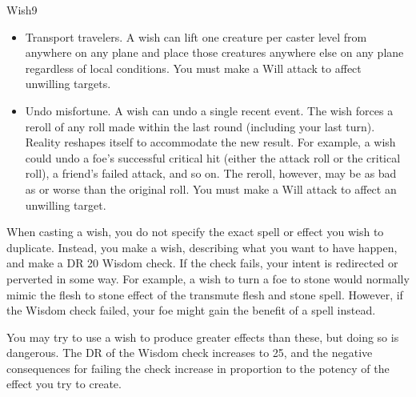 \begin{spellfooter}
\begin{spellsection}{Wish}{9}
\begin{spellcontent}
\begin{itemize}
            \item Transport travelers. A wish can lift one creature per caster level from anywhere on any plane and place those creatures anywhere else on any plane regardless of local conditions. You must make a Will attack to affect unwilling targets.
            \item Undo misfortune. A wish can undo a single recent event. The wish forces a reroll of any roll made within the last round (including your last turn). Reality reshapes itself to accommodate the new result. For example, a wish could undo a foe's successful critical hit (either the attack roll or the critical roll), a friend's failed attack, and so on. The reroll, however, may be as bad as or worse than the original roll. You must make a Will attack to affect an unwilling target.
        \end{itemize}
        \par When casting a wish, you do not specify the exact spell or effect you wish to duplicate. Instead, you make a wish, describing what you want to have happen, and make a DR 20 Wisdom check. If the check fails, your intent is redirected or perverted in some way. For example, a wish to turn a foe to stone would normally mimic the flesh to stone effect of the transmute flesh and stone spell. However, if the Wisdom check failed, your foe might gain the benefit of a  spell instead.
        \par You may try to use a wish to produce greater effects than these, but doing so is dangerous. The DR of the Wisdom check increases to 25, and the negative consequences for failing the check increase in proportion to the potency of the effect you try to create.
    \end{spellcontent}
\end{spellsection}


\end{spellfooter}
